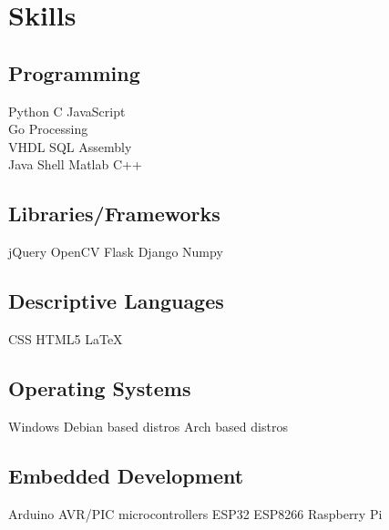 \documentclass[]{plushcv}
\begin{document}
\begin{minipage}[t]{0.3\textwidth}


\section{Skills}
\subsection{Programming}
\sectionsep
{}
Python \textbullet{} C \textbullet{} JavaScript  \\ Go \textbullet{} Processing \\
\sectionsep
{}
VHDL \textbullet{} SQL \textbullet{} Assembly \\
\sectionsep
{}
Java \textbullet{}  Shell \textbullet{} Matlab \textbullet{} C++ \\
\sectionsep
\sectionsep
\subsection{Libraries/Frameworks}
\sectionsep
jQuery \textbullet{} OpenCV \textbullet{} Flask \textbullet{} Django \textbullet{} Numpy \\
\sectionsep
\sectionsep
\subsection{Descriptive Languages}
\sectionsep
CSS \textbullet{} HTML5 \textbullet{} \LaTeX
\sectionsep
\subsection{Operating Systems}
\sectionsep
Windows \textbullet{} Debian based distros \textbullet{} Arch based distros \\
\sectionsep
\sectionsep
\subsection{Embedded Development}
\sectionsep
Arduino \textbullet{} AVR/PIC microcontrollers \textbullet{} ESP32 \textbullet{} ESP8266 \textbullet{} Raspberry Pi \\

\sectionsep



\end{minipage}
\end{document}
